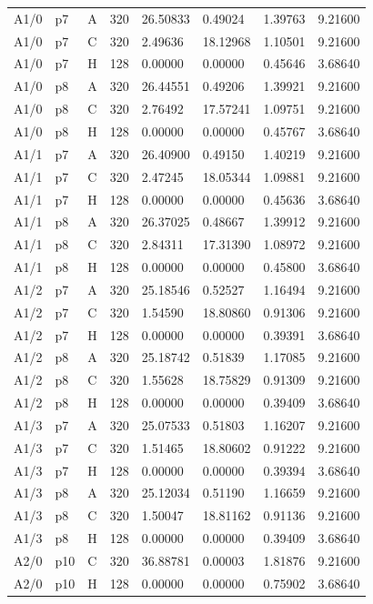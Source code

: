 \begin{longtable}{llllllll}
A1/0 & p7 & A & 320 & 26.50833 & 0.49024 & 1.39763 & 9.21600 \\
A1/0 & p7 & C & 320 & 2.49636 & 18.12968 & 1.10501 & 9.21600 \\
A1/0 & p7 & H & 128 & 0.00000 & 0.00000 & 0.45646 & 3.68640 \\
A1/0 & p8 & A & 320 & 26.44551 & 0.49206 & 1.39921 & 9.21600 \\
A1/0 & p8 & C & 320 & 2.76492 & 17.57241 & 1.09751 & 9.21600 \\
A1/0 & p8 & H & 128 & 0.00000 & 0.00000 & 0.45767 & 3.68640 \\
A1/1 & p7 & A & 320 & 26.40900 & 0.49150 & 1.40219 & 9.21600 \\
A1/1 & p7 & C & 320 & 2.47245 & 18.05344 & 1.09881 & 9.21600 \\
A1/1 & p7 & H & 128 & 0.00000 & 0.00000 & 0.45636 & 3.68640 \\
A1/1 & p8 & A & 320 & 26.37025 & 0.48667 & 1.39912 & 9.21600 \\
A1/1 & p8 & C & 320 & 2.84311 & 17.31390 & 1.08972 & 9.21600 \\
A1/1 & p8 & H & 128 & 0.00000 & 0.00000 & 0.45800 & 3.68640 \\
A1/2 & p7 & A & 320 & 25.18546 & 0.52527 & 1.16494 & 9.21600 \\
A1/2 & p7 & C & 320 & 1.54590 & 18.80860 & 0.91306 & 9.21600 \\
A1/2 & p7 & H & 128 & 0.00000 & 0.00000 & 0.39391 & 3.68640 \\
A1/2 & p8 & A & 320 & 25.18742 & 0.51839 & 1.17085 & 9.21600 \\
A1/2 & p8 & C & 320 & 1.55628 & 18.75829 & 0.91309 & 9.21600 \\
A1/2 & p8 & H & 128 & 0.00000 & 0.00000 & 0.39409 & 3.68640 \\
A1/3 & p7 & A & 320 & 25.07533 & 0.51803 & 1.16207 & 9.21600 \\
A1/3 & p7 & C & 320 & 1.51465 & 18.80602 & 0.91222 & 9.21600 \\
A1/3 & p7 & H & 128 & 0.00000 & 0.00000 & 0.39394 & 3.68640 \\
A1/3 & p8 & A & 320 & 25.12034 & 0.51190 & 1.16659 & 9.21600 \\
A1/3 & p8 & C & 320 & 1.50047 & 18.81162 & 0.91136 & 9.21600 \\
A1/3 & p8 & H & 128 & 0.00000 & 0.00000 & 0.39409 & 3.68640 \\
A2/0 & p10 & C & 320 & 36.88781 & 0.00003 & 1.81876 & 9.21600 \\
A2/0 & p10 & H & 128 & 0.00000 & 0.00000 & 0.75902 & 3.68640 \\

\end{longtable}
